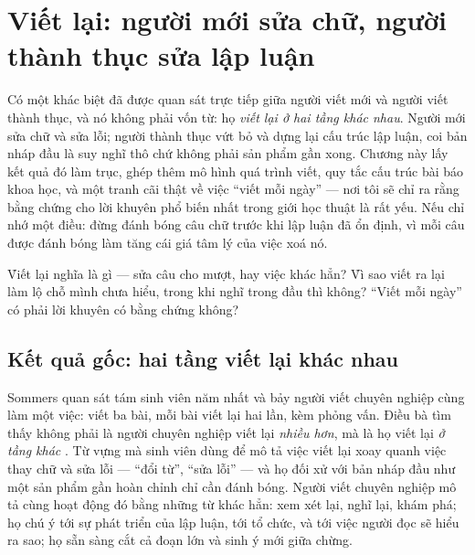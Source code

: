 \documentclass[../hieu-suat.tex]{subfiles}
\begin{document}
\chapter{Viết lại: người mới sửa chữ, người thành thục sửa lập luận}

\begin{tomtat}
Có một khác biệt đã được quan sát trực tiếp giữa người viết mới và người viết thành thục, và nó không phải vốn từ: họ \emph{viết lại ở hai tầng khác nhau}. Người mới sửa chữ và sửa lỗi; người thành thục vứt bỏ và dựng lại cấu trúc lập luận, coi bản nháp đầu là suy nghĩ thô chứ không phải sản phẩm gần xong. Chương này lấy kết quả đó làm trục, ghép thêm mô hình quá trình viết, quy tắc cấu trúc bài báo khoa học, và một tranh cãi thật về việc ``viết mỗi ngày'' --- nơi tôi sẽ chỉ ra rằng bằng chứng cho lời khuyên phổ biến nhất trong giới học thuật là rất yếu. Nếu chỉ nhớ một điều: đừng đánh bóng câu chữ trước khi lập luận đã ổn định, vì mỗi câu được đánh bóng làm tăng cái giá tâm lý của việc xoá nó.
\end{tomtat}

\begin{nentang}
\end{nentang}

\begin{khoigoi}
\h{Viết lại nghĩa là gì --- sửa câu cho mượt, hay việc khác hẳn?}
\h{Vì sao viết ra lại làm lộ chỗ mình chưa hiểu, trong khi nghĩ trong đầu thì không?}
\h{``Viết mỗi ngày'' có phải lời khuyên có bằng chứng không?}
\end{khoigoi}

\section{Kết quả gốc: hai tầng viết lại khác nhau}

Sommers \cite{sommers1980} quan sát tám sinh viên năm nhất và bảy người viết chuyên nghiệp cùng làm một việc: viết ba bài, mỗi bài viết lại hai lần, kèm phỏng vấn. Điều bà tìm thấy không phải là người chuyên nghiệp viết lại \emph{nhiều hơn}, mà là họ viết lại \emph{ở tầng khác} \nD{}. Từ vựng mà sinh viên dùng để mô tả việc viết lại xoay quanh việc thay chữ và sửa lỗi --- ``đổi từ'', ``sửa lỗi'' --- và họ đối xử với bản nháp đầu như một sản phẩm gần hoàn chỉnh chỉ cần đánh bóng. Người viết chuyên nghiệp mô tả cùng hoạt động đó bằng những từ khác hẳn: xem xét lại, nghĩ lại, khám phá; họ chú ý tới sự phát triển của lập luận, tới tổ chức, và tới việc người đọc sẽ hiểu ra sao; họ sẵn sàng cắt cả đoạn lớn và sinh ý mới giữa chừng.
\end{document}
